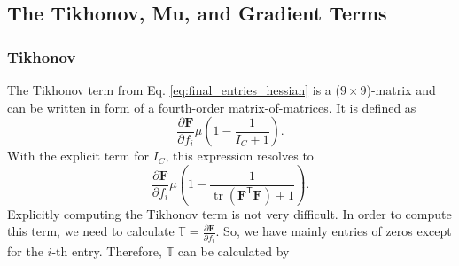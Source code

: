 {{{\subsection{The Tikhonov, Mu, and Gradient Terms}
\subsubsection{Tikhonov}
The Tikhonov term from Eq. \eqref{eq:final_entries_hessian} is a ($9 \times 9$)-matrix and can be written in form of a fourth-order matrix-of-matrices. It is defined as
\[
	\frac{\partial \mathbf{F}}{\partial f_i} \mu \left( 1 - \frac{1}{I_{C} + 1}\right).
\]
With the explicit term for $I_{C}$, this expression resolves to
\[
	\frac{\partial \mathbf{F}}{\partial f_i} \mu \left( 1 - \frac{1}{\operatorname{tr}(\mathbf{F}^\mathsf{T} \mathbf{F}) + 1}\right).
\]
Explicitly computing the Tikhonov term is not very difficult. In order to compute this term, we need to calculate $\mathbb{T} = \frac{\partial \mathbf{F}}{\partial f_i}$. So, we have mainly entries of zeros except for the $i$-th entry. Therefore, $\mathbb{T}$ can be calculated by
\[
\]}}}
